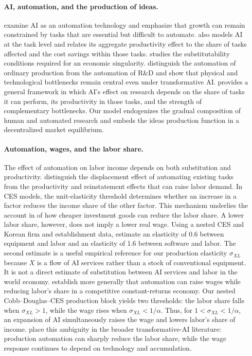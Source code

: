 \paragraph{AI, automation, and the production of ideas.}
\citet{aghionjonesjones2019} examine AI as an automation technology and emphasize that
growth can remain constrained by tasks that are essential but difficult to automate.
\citet{acemoglu2025} also models AI at the task level and relates its aggregate
productivity effect to the share of tasks affected and the cost savings within those
tasks.
\citet{nordhaus2021} studies the substitutability conditions required for an economic
singularity. \citet{trammellkorinek2023} distinguish the automation of ordinary
production from the automation of R\&D and show that physical and technological
bottlenecks remain central even under transformative AI. \citet{jones2025rd} provides
a general framework in which AI's effect on research depends on the share of tasks it
can perform, its productivity in those tasks, and the strength of complementary
bottlenecks. Our model endogenizes the gradual composition of human and automated
research and embeds the ideas production function in a decentralized market
equilibrium.

\paragraph{Automation, wages, and the labor share.}
The effect of automation on labor income depends on both substitution and
productivity. \citet{acemoglurestrepo2019} distinguish the displacement effect of
automating existing tasks from the productivity and reinstatement effects that can
raise labor demand. In CES models, the unit-elasticity threshold determines whether
an increase in a factor reduces the income share of the other factor. This mechanism
underlies the account in \citet{karabarbounisneiman2014} of how cheaper investment
goods can reduce the labor share. A lower labor share, however, does not imply a lower
real wage. Using a nested CES and Korean firm and establishment data,
\citet{aumshin2024} estimate an elasticity of 0.6 between equipment and labor and an
elasticity of 1.6 between software and labor. The second estimate is a useful
empirical reference for our production elasticity $\sigma_{XL}$ because $X$ is a flow of
AI services rather than a stock of conventional equipment. It is not a direct
estimate of substitution between AI services and labor in the world economy.
\citet{autorkausik2026} establish more generally that automation can raise
wages while reducing labor's share in a competitive constant-returns economy.
Our nested Cobb--Douglas--CES production block yields two thresholds: the labor
share falls when
$\sigma_{XL}>1$, while the wage rises when $\sigma_{XL}<1/\alpha$. Thus, for
$1<\sigma_{XL}<1/\alpha$, an expansion of AI simultaneously raises the wage and lowers
labor's share of income. \citet{trammellkorinek2023} place this ambiguity in the
broader transformative-AI literature: production automation can sharply reduce the
labor share, while the wage response continues to depend on technology and
accumulation.

